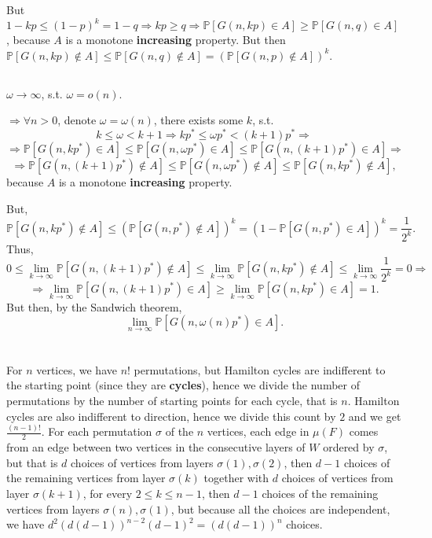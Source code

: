 \documentclass{article}
\begin{document}
But $1-kp\leq(1-p)^k=1-q\Rightarrow{kp\geq{q}}\Rightarrow\mathbb{P}[G(n,kp)\in{A}]\geq\mathbb{P}[G(n,q)\in{A}]$, because $A$ is a monotone \textbf{increasing} property. But then $\mathbb{P}[G(n,kp)\notin{A}]\leq\mathbb{P}[G(n,q)\notin{A}]=(\mathbb{P}[G(n,p)\notin{A}])^k$.
\subsection{}
$\omega\rightarrow\infty$, s.t. $\omega=o(n)$.

$\Rightarrow\forall{n>0}$, denote $\omega=\omega(n)$, there exists some $k$, s.t. 
\[k\leq\omega<k+1\Rightarrow{k}p^\ast\leq\omega{p^\ast}<(k+1)p^\ast\Rightarrow\]\[\Rightarrow\mathbb{P}[G(n,kp^\ast)\in{A}]\leq\mathbb{P}[G(n,\omega{p^\ast})\in{A}]\leq\mathbb{P}[G(n,(k+1)p^\ast)\in{A}]\Rightarrow\]\[\Rightarrow\mathbb{P}[G(n,(k+1)p^\ast)\notin{A}]\leq\mathbb{P}[G(n,\omega{p^\ast})\notin{A}]\leq\mathbb{P}[G(n,kp^\ast)\notin{A}],\] because $A$ is a monotone \textbf{increasing} property.

But, 
\[\mathbb{P}[G(n,kp^\ast)\notin{A}]\leq(\mathbb{P}[G(n,p^\ast)\notin{A}])^k=(1-\mathbb{P}[G(n,p^\ast)\in{A}])^k=\frac{1}{2^k}.\]
Thus, 
\[0\leq\lim_{k\rightarrow\infty}\mathbb{P}[G(n,(k+1)p^\ast)\notin{A}]\leq\lim_{k\rightarrow\infty}\mathbb{P}[G(n,kp^\ast)\notin{A}]\leq\lim_{k\rightarrow\infty}\frac{1}{2^k}=0\Rightarrow\]\[\Rightarrow\lim_{k\rightarrow\infty}\mathbb{P}[G(n,(k+1)p^\ast)\in{A}]\geq\lim_{k\rightarrow\infty}\mathbb{P}[G(n,kp^\ast)\in{A}]=1.\]
But then, by the Sandwich theorem, 
\[\lim_{n\rightarrow\infty}\mathbb{P}[G(n,\omega(n)p^\ast)\in{A}].\]
\section{}
\section{}
\section{}
\subsection{}
For $n$ vertices, we have $n!$ permutations, but Hamilton cycles are indifferent to the starting point (since they are \textbf{cycles}), hence we divide the number of permutations by the number of starting points for each cycle, that is $n$. Hamilton cycles are also indifferent to direction, hence we divide this count by $2$ and we get $\frac{(n-1)!}{2}$. For each permutation $\sigma$ of the $n$ vertices, each edge in $\mu(F)$ comes from an edge between two vertices in the consecutive layers of $W$ ordered by $\sigma$, but that is $d$ choices of vertices from layers $\sigma(1),\sigma(2)$, then $d-1$ choices of the remaining vertices from layer $\sigma(k)$ together with $d$ choices of vertices from layer $\sigma(k+1)$, for every $2\leq{k}\leq{n-1}$, then $d-1$ choices of the remaining vertices from layers $\sigma(n),\sigma(1)$, but because all the choices are independent, we have $d^2(d(d-1))^{n-2}(d-1)^2=(d(d-1))^n$ choices.
\end{document}
